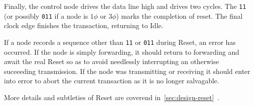 Finally, the control node drives the data line high and drives two cycles. The
{\tt 11} (or possibly {\tt 011} if a node is $1\phi$ or $3\phi$) marks the
completion of reset. The final clock edge finishes the transaction, returning
\bus to Idle.

If a node records a sequence other than {\tt 11} or {\tt 011} during Reset, an
error has occurred. If the node is simply forwarding, it should return to
forwarding and await the real Reset so as to avoid needlessly interrupting an
otherwise suceeeding transmission. If the node was transmitting or receiving
it should enter into {\sc error} to abort the current transaction as it is no
longer salvagable.

More details and subtleties of Reset are coverend
in~\ref{sec:design-reset}~.
